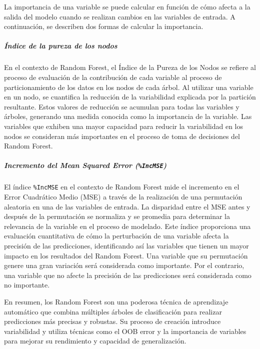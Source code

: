 La importancia de una variable se puede calcular en función de cómo afecta a la salida del modelo cuando se realizan cambios en las variables de entrada. A continuación, se describen dos formas de calcular la importancia.

\subparagraph{Índice de la pureza de los nodos}

En el contexto de Random Forest, el Índice de la Pureza de los Nodos se refiere al proceso de evaluación de la contribución de cada variable al proceso de particionamiento de los datos en los nodos de cada árbol. Al utilizar una variable en un nodo, se cuantifica la reducción de la variabilidad explicada por la partición resultante. Estos valores de reducción se acumulan para todas las variables y árboles, generando una medida conocida como la importancia de la variable. Las variables que exhiben una mayor capacidad para reducir la variabilidad en los nodos se consideran más importantes en el proceso de toma de decisiones del Random Forest.

\subparagraph{Incremento del Mean Squared Error (\texttt{\%IncMSE})}

El índice \texttt{\%IncMSE} en el contexto de Random Forest mide el incremento en el Error Cuadrático Medio (MSE) a través de la realización de una permutación aleatoria en una de las variables de entrada. La disparidad entre el MSE antes y después de la permutación se normaliza y se promedia para determinar la relevancia de la variable en el proceso de modelado. Este índice proporciona una evaluación cuantitativa de cómo la perturbación de una variable afecta la precisión de las predicciones, identificando así las variables que tienen un mayor impacto en los resultados del Random Forest. Una variable que su permutación genere una gran variación será considerada como importante. Por el contrario, una variable que no afecte la precisión de las predicciones será considerada como no importante.

\vspace{10pt}

En resumen, los Random Forest son una poderosa técnica de aprendizaje automático que combina múltiples árboles de clasificación para realizar predicciones más precisas y robustas. Su proceso de creación introduce variabilidad y utiliza técnicas como el OOB error y la importancia de variables para mejorar su rendimiento y capacidad de generalización.
